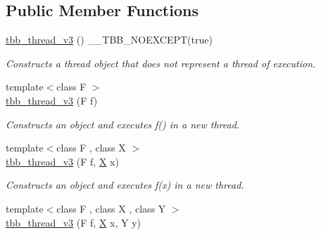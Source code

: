 \subsection*{Public Member Functions}
\begin{DoxyCompactItemize}
\item 
\hypertarget{classtbb_1_1internal_1_1tbb__thread__v3_a15b84e454eb0179e010b90a88baa0933}{}\hyperlink{classtbb_1_1internal_1_1tbb__thread__v3_a15b84e454eb0179e010b90a88baa0933}{tbb\+\_\+thread\+\_\+v3} () \+\_\+\+\_\+\+T\+B\+B\+\_\+\+N\+O\+E\+X\+C\+E\+P\+T(true)\label{classtbb_1_1internal_1_1tbb__thread__v3_a15b84e454eb0179e010b90a88baa0933}

\begin{DoxyCompactList}\small\item\em Constructs a thread object that does not represent a thread of execution. \end{DoxyCompactList}\item 
\hypertarget{classtbb_1_1internal_1_1tbb__thread__v3_a9c5587ab76ca1aa98bae7fe69a459466}{}{\footnotesize template$<$class F $>$ }\\\hyperlink{classtbb_1_1internal_1_1tbb__thread__v3_a9c5587ab76ca1aa98bae7fe69a459466}{tbb\+\_\+thread\+\_\+v3} (F f)\label{classtbb_1_1internal_1_1tbb__thread__v3_a9c5587ab76ca1aa98bae7fe69a459466}

\begin{DoxyCompactList}\small\item\em Constructs an object and executes f() in a new thread. \end{DoxyCompactList}\item 
\hypertarget{classtbb_1_1internal_1_1tbb__thread__v3_a672a5367e687635c869926bf8a986296}{}{\footnotesize template$<$class F , class X $>$ }\\\hyperlink{classtbb_1_1internal_1_1tbb__thread__v3_a672a5367e687635c869926bf8a986296}{tbb\+\_\+thread\+\_\+v3} (F f, \hyperlink{structX}{X} x)\label{classtbb_1_1internal_1_1tbb__thread__v3_a672a5367e687635c869926bf8a986296}

\begin{DoxyCompactList}\small\item\em Constructs an object and executes f(x) in a new thread. \end{DoxyCompactList}\item 
\hypertarget{classtbb_1_1internal_1_1tbb__thread__v3_ac3f57678f2a289084a6d275f8f8fbc62}{}{\footnotesize template$<$class F , class X , class Y $>$ }\\\hyperlink{classtbb_1_1internal_1_1tbb__thread__v3_ac3f57678f2a289084a6d275f8f8fbc62}{tbb\+\_\+thread\+\_\+v3} (F f, \hyperlink{structX}{X} x, Y y)\label{classtbb_1_1internal_1_1tbb__thread__v3_ac3f57678f2a289084a6d275f8f8fbc62}


\end{DoxyCompactItemize}
